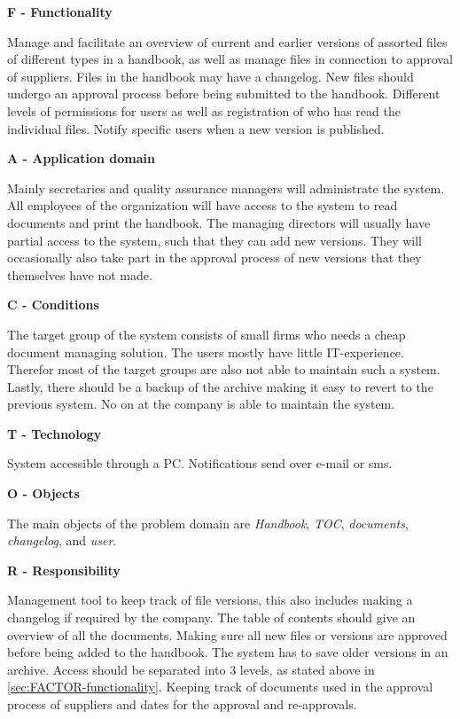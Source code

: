 \textbf{F - Functionality}\label{sec:FACTOR-functionality}

Manage and facilitate an overview of current and earlier versions of assorted files of different types in a handbook, as well as manage files in connection to approval of suppliers.
Files in the handbook may have a changelog.
New files should undergo an approval process before being submitted to the handbook. 
Different levels of permissions for users as well as registration of who has read the individual files. 
Notify specific users when a new version is published.

\textbf{A - Application domain}

Mainly secretaries and quality assurance managers will administrate the system. 
All employees of the organization will have access to the system to read documents and print the handbook. 
The managing directors will usually have partial access to the system, such that they can add new versions. 
They will occasionally also take part in the approval process of new versions that they themselves have not made.

\textbf{C - Conditions}

The target group of the system consists of small firms who needs a cheap document managing solution. 
The users mostly have little IT-experience.
Therefor most of the target groups are also not able to maintain such a system.
Lastly, there should be a backup of the archive making it easy to revert to the previous system.
No on at the company is able to maintain the system.

\textbf{T - Technology}

System accessible through a PC.
Notifications send over e-mail or sms.

\textbf{O - Objects}

The main objects of the problem domain are \textit{Handbook}, \textit{TOC}, \textit{documents}, \textit{changelog}, and \textit{user}.

\textbf{R  - Responsibility}

Management tool to keep track of file versions, this also includes making a changelog if required by the company.
The table of contents should give an overview of all the documents. 
Making sure all new files or versions are approved before being added to the handbook.
The system has to save older versions in an archive. 
Access should be separated into 3 levels, as stated above in \cref{sec:FACTOR-functionality}. 
Keeping track of documents used in the approval process of suppliers and dates for the approval and re-approvals. 


